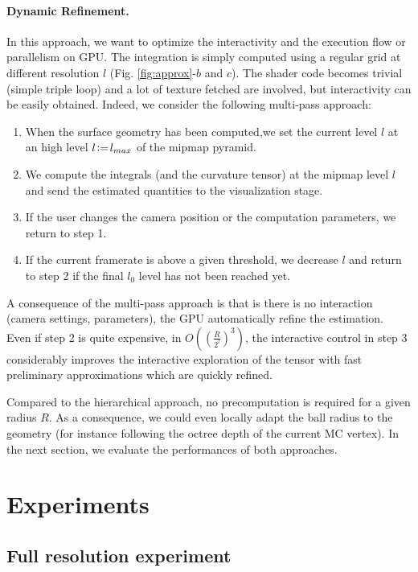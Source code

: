 \documentclass{llncs}
\begin{document}
\paragraph{Dynamic Refinement.} In this approach, we want to optimize
the interactivity and the execution flow or parallelism on GPU. The
integration is simply computed using a regular grid at different
resolution $l$ (Fig. \ref{fig:approx}-$b$ and $c$). The shader code
becomes trivial (simple triple loop) and a lot of texture fetched are
involved, but interactivity can be easily obtained. Indeed, we
consider the following multi-pass approach:
\begin{enumerate}
\item When the surface geometry has been computed,we set the current
  level $l$ at an high level $l\!\mathrel{\mathop:}=\! l_{max}$ of the mipmap
  pyramid.
\item We compute the integrals (and the curvature tensor) at the
  mipmap level $l$ and  send the estimated quantities to the
  visualization stage.
\item If the user changes the camera position or the computation
  parameters, we return to step 1.
\item If the current framerate is above a given threshold, we decrease
  $l$ and return to step 2 if the final $l_0$ level has not been
  reached yet.
\end{enumerate}
A consequence of the multi-pass approach is that is there is no
interaction (camera settings, parameters), the GPU automatically
refine the estimation. Even if step 2 is quite expensive, in
$O\left(\left(\frac{R}{2^l}\right)^3\right)$, the interactive control
 in step 3 considerably improves the interactive exploration of the
 tensor with fast preliminary approximations which are quickly refined.

 Compared to the hierarchical approach, no precomputation is required
 for a given radius $R$. As a consequence, we could even locally adapt
 the ball radius to the geometry (for instance following the octree
 depth of the current MC vertex). In the next section, we evaluate the
 performances of both approaches.

\section{Experiments}
\label{sec:experiments}

\subsection{Full resolution experiment}
\end{document}
